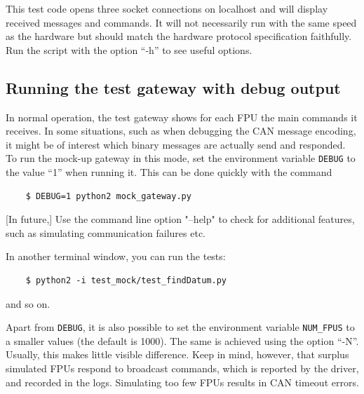 \documentclass[11pt,a4paper]{scrartcl}
\begin{document}
This test code opens three socket connections on localhost and will
display received messages and commands. It will not necessarily run
with the same speed as the hardware but should match the hardware
protocol specification faithfully. Run the script with the option
``-h'' to see useful options.

\subsection{Running the test gateway with debug output}

In normal operation, the test gateway shows for each FPU the main
commands it receives. In some situations, such as when debugging the
CAN message encoding, it might be of interest which binary messages
are actually send and responded. To run the mock-up gateway in this
mode, set the environment variable \texttt{DEBUG} to the value ``1''
when running it. This can be done quickly with the command

  \begin{verbatim}
    $ DEBUG=1 python2 mock_gateway.py
  \end{verbatim}    



[In future,] Use the command line option "--help" to check for additional features,
such as simulating communication failures etc.

In another terminal window, you can run the tests:
  \begin{verbatim}
    $ python2 -i test_mock/test_findDatum.py
  \end{verbatim}    
and so on.

Apart from \texttt{DEBUG}, it is also possible to set the environment
variable \texttt{NUM\_FPUS} to a smaller values (the default is 1000).
The same is achieved using the option ``-N''.  Usually, this makes
little visible difference. Keep in mind, however, that surplus
simulated FPUs respond to broadcast commands, which is reported by the
driver, and recorded in the logs. Simulating too few FPUs results in
CAN timeout errors.

\printindex
\end{document}
